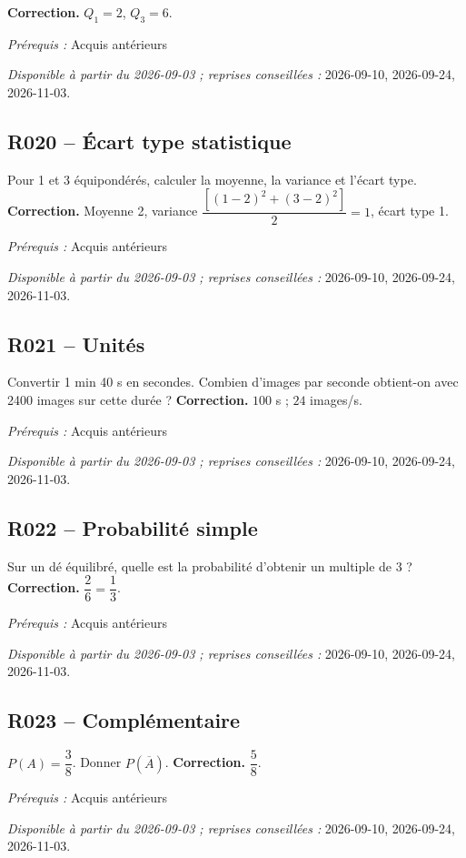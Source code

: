 \ifmxteacher\textbf{Correction.} $Q_1=2$, $Q_3=6$.\par\textit{Prérequis :} Acquis antérieurs\par\textit{Disponible à partir du 2026-09-03 ; reprises conseillées :} 2026-09-10, 2026-09-24, 2026-11-03.\fi
{}\subsection*{R020 -- Écart type statistique}\label{R020}
Pour 1 et 3 équipondérés, calculer la moyenne, la variance et l’écart type.
\ifmxteacher\textbf{Correction.} Moyenne 2, variance $\dfrac{[(1-2)^2+(3-2)^2]}{2}=1$, écart type 1.\par\textit{Prérequis :} Acquis antérieurs\par\textit{Disponible à partir du 2026-09-03 ; reprises conseillées :} 2026-09-10, 2026-09-24, 2026-11-03.\fi
{}\subsection*{R021 -- Unités}\label{R021}
Convertir 1 min 40 s en secondes. Combien d’images par seconde obtient-on avec 2400 images sur cette durée ?
\ifmxteacher\textbf{Correction.} $100$ s ; $24$ images/s.\par\textit{Prérequis :} Acquis antérieurs\par\textit{Disponible à partir du 2026-09-03 ; reprises conseillées :} 2026-09-10, 2026-09-24, 2026-11-03.\fi
{}\subsection*{R022 -- Probabilité simple}\label{R022}
Sur un dé équilibré, quelle est la probabilité d’obtenir un multiple de 3 ?
\ifmxteacher\textbf{Correction.} $\dfrac{2}{6}=\dfrac{1}{3}$.\par\textit{Prérequis :} Acquis antérieurs\par\textit{Disponible à partir du 2026-09-03 ; reprises conseillées :} 2026-09-10, 2026-09-24, 2026-11-03.\fi
{}\subsection*{R023 -- Complémentaire}\label{R023}
$P(A)=\dfrac{3}{8}$. Donner $P(\overline A)$.
\ifmxteacher\textbf{Correction.} $\dfrac{5}{8}$.\par\textit{Prérequis :} Acquis antérieurs\par\textit{Disponible à partir du 2026-09-03 ; reprises conseillées :} 2026-09-10, 2026-09-24, 2026-11-03.\fi
